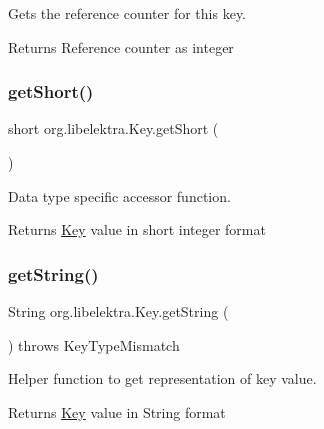 Gets the reference counter for this key. 

\begin{DoxyReturn}{Returns}
Reference counter as integer 
\end{DoxyReturn}
\mbox{\label{classorg_1_1libelektra_1_1Key_a51754727fad0f4f9a540226ec329c74b}} 
\subsubsection{\texorpdfstring{get\+Short()}{getShort()}}
{\footnotesize\ttfamily short org.\+libelektra.\+Key.\+get\+Short (\begin{DoxyParamCaption}{ }\end{DoxyParamCaption})\hspace{0.3cm}{\ttfamily [inline]}}



Data type specific accessor function. 

\begin{DoxyReturn}{Returns}
\hyperlink{classorg_1_1libelektra_1_1Key}{Key} value in short integer format 
\end{DoxyReturn}
\mbox{\label{classorg_1_1libelektra_1_1Key_a3464485c19d49b6763f6c831cf5ed06c}} 
\subsubsection{\texorpdfstring{get\+String()}{getString()}}
{\footnotesize\ttfamily String org.\+libelektra.\+Key.\+get\+String (\begin{DoxyParamCaption}{ }\end{DoxyParamCaption}) throws Key\+Type\+Mismatch\hspace{0.3cm}{\ttfamily [inline]}}



Helper function to get representation of key value. 

\begin{DoxyReturn}{Returns}
\hyperlink{classorg_1_1libelektra_1_1Key}{Key} value in String format 
\end{DoxyReturn}

